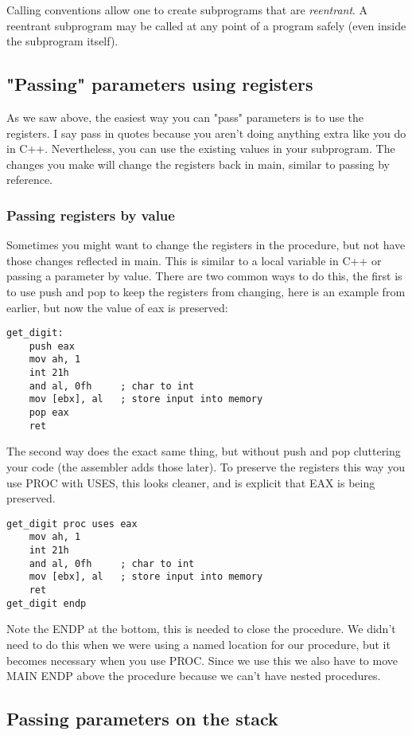 Calling conventions
allow one to create subprograms that are \emph{reentrant}. A reentrant
subprogram may be called at any point of a program safely (even inside
the subprogram itself).

\subsection{"Passing" parameters using registers}
As we saw above, the easiest way you can "pass" parameters is to use the registers.  
I say pass in quotes because you aren't doing anything extra like you do in C++.  Nevertheless,
you can use the existing values in your subprogram.  The changes
 you make will change the registers back in main, similar to passing by reference. 
 \subsubsection{Passing registers by value}
 Sometimes you might want to change the registers in the procedure, but not have those changes
 reflected in main.  This is similar to a local variable in C++ or passing a parameter by value.  There are two 
 common ways to do this, the first is to use push and pop to keep the registers from changing, 
 here is an example from earlier, but now the value of eax is preserved:
 \begin{lstlisting}[language={[x86masm]Assembler}]
 get_digit:
    push eax
    mov ah, 1
    int 21h
    and al, 0fh     ; char to int
    mov [ebx], al   ; store input into memory
    pop eax
    ret        
\end{lstlisting}
The second way does the exact same thing, but without push and pop cluttering your code 
(the assembler adds those later).  To preserve the registers this way you use PROC with USES, 
this looks cleaner, and is explicit that EAX is being preserved.  
 \begin{lstlisting}[language={[x86masm]Assembler}]
get_digit proc uses eax
    mov ah, 1
    int 21h
    and al, 0fh     ; char to int
    mov [ebx], al   ; store input into memory
    ret         
get_digit endp
\end{lstlisting}
Note the ENDP at the bottom, this is needed to close the procedure.  We didn't need to do this when
we were using a named location for our procedure, but it becomes necessary when you use PROC.
Since we use this we also have to move {\code MAIN ENDP} above the procedure because we can't 
have nested procedures. 
\subsection{Passing parameters on the stack}

